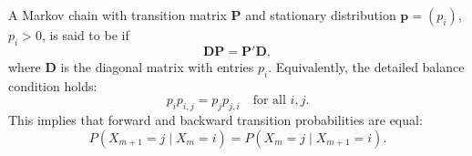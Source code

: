 A Markov chain with transition matrix $\mathbf{P}$ and stationary distribution $\mathbf{p} = (p_i)$, $p_i > 0$, is said to be  if
$$\mathbf{D}\mathbf{P} = \mathbf{P}'\mathbf{D},$$
where $\mathbf{D}$ is the diagonal matrix with entries $p_i$. Equivalently, the detailed balance condition holds:
$$p_i p_{i,j} = p_j p_{j,i} \quad \text{for all } i, j.$$
This implies that forward and backward transition probabilities are equal:
$$P(X_{m+1} = j \mid X_m = i) = P(X_m = j \mid X_{m+1} = i).$$
